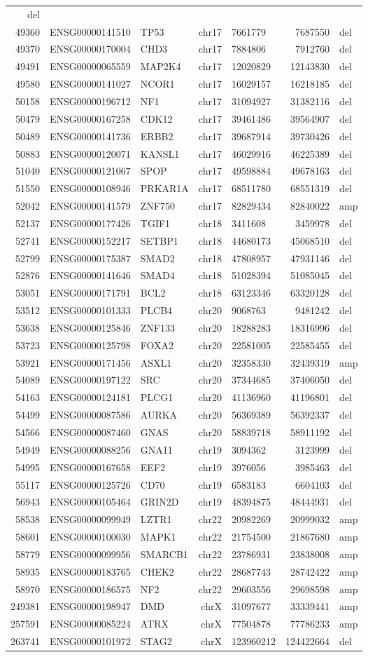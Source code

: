 \documentclass[]{article}
\begin{document}
\begin{longtable}[]{@{}rrlrlrl@{}}
del\tabularnewline
49360 & ENSG00000141510 & TP53 & chr17 & 7661779 & 7687550 &
del\tabularnewline
49370 & ENSG00000170004 & CHD3 & chr17 & 7884806 & 7912760 &
del\tabularnewline
49491 & ENSG00000065559 & MAP2K4 & chr17 & 12020829 & 12143830 &
del\tabularnewline
49580 & ENSG00000141027 & NCOR1 & chr17 & 16029157 & 16218185 &
del\tabularnewline
50158 & ENSG00000196712 & NF1 & chr17 & 31094927 & 31382116 &
del\tabularnewline
50479 & ENSG00000167258 & CDK12 & chr17 & 39461486 & 39564907 &
del\tabularnewline
50489 & ENSG00000141736 & ERBB2 & chr17 & 39687914 & 39730426 &
del\tabularnewline
50883 & ENSG00000120071 & KANSL1 & chr17 & 46029916 & 46225389 &
del\tabularnewline
51040 & ENSG00000121067 & SPOP & chr17 & 49598884 & 49678163 &
del\tabularnewline
51550 & ENSG00000108946 & PRKAR1A & chr17 & 68511780 & 68551319 &
del\tabularnewline
52042 & ENSG00000141579 & ZNF750 & chr17 & 82829434 & 82840022 &
amp\tabularnewline
52137 & ENSG00000177426 & TGIF1 & chr18 & 3411608 & 3459978 &
del\tabularnewline
52741 & ENSG00000152217 & SETBP1 & chr18 & 44680173 & 45068510 &
del\tabularnewline
52799 & ENSG00000175387 & SMAD2 & chr18 & 47808957 & 47931146 &
del\tabularnewline
52876 & ENSG00000141646 & SMAD4 & chr18 & 51028394 & 51085045 &
del\tabularnewline
53051 & ENSG00000171791 & BCL2 & chr18 & 63123346 & 63320128 &
del\tabularnewline
53512 & ENSG00000101333 & PLCB4 & chr20 & 9068763 & 9481242 &
del\tabularnewline
53638 & ENSG00000125846 & ZNF133 & chr20 & 18288283 & 18316996 &
del\tabularnewline
53723 & ENSG00000125798 & FOXA2 & chr20 & 22581005 & 22585455 &
del\tabularnewline
53921 & ENSG00000171456 & ASXL1 & chr20 & 32358330 & 32439319 &
amp\tabularnewline
54089 & ENSG00000197122 & SRC & chr20 & 37344685 & 37406050 &
del\tabularnewline
54163 & ENSG00000124181 & PLCG1 & chr20 & 41136960 & 41196801 &
del\tabularnewline
54499 & ENSG00000087586 & AURKA & chr20 & 56369389 & 56392337 &
del\tabularnewline
54566 & ENSG00000087460 & GNAS & chr20 & 58839718 & 58911192 &
del\tabularnewline
54949 & ENSG00000088256 & GNA11 & chr19 & 3094362 & 3123999 &
del\tabularnewline
54995 & ENSG00000167658 & EEF2 & chr19 & 3976056 & 3985463 &
del\tabularnewline
55117 & ENSG00000125726 & CD70 & chr19 & 6583183 & 6604103 &
del\tabularnewline
56943 & ENSG00000105464 & GRIN2D & chr19 & 48394875 & 48444931 &
del\tabularnewline
58538 & ENSG00000099949 & LZTR1 & chr22 & 20982269 & 20999032 &
amp\tabularnewline
58601 & ENSG00000100030 & MAPK1 & chr22 & 21754500 & 21867680 &
amp\tabularnewline
58779 & ENSG00000099956 & SMARCB1 & chr22 & 23786931 & 23838008 &
amp\tabularnewline
58935 & ENSG00000183765 & CHEK2 & chr22 & 28687743 & 28742422 &
amp\tabularnewline
58970 & ENSG00000186575 & NF2 & chr22 & 29603556 & 29698598 &
amp\tabularnewline
249381 & ENSG00000198947 & DMD & chrX & 31097677 & 33339441 &
amp\tabularnewline
257591 & ENSG00000085224 & ATRX & chrX & 77504878 & 77786233 &
amp\tabularnewline
263741 & ENSG00000101972 & STAG2 & chrX & 123960212 & 124422664 &
del\tabularnewline
\bottomrule
\end{longtable}
\end{document}
